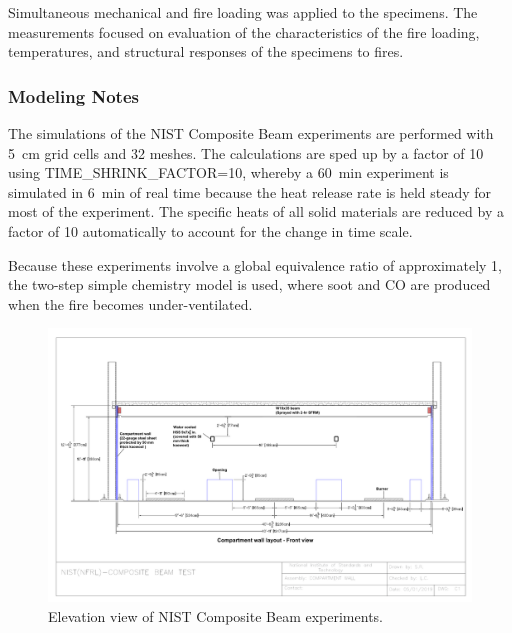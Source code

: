 Simultaneous mechanical and fire loading was applied to the specimens. The measurements focused on evaluation of the characteristics of the fire loading, temperatures, and structural responses of the specimens to fires.

\subsubsection{Modeling Notes}

The simulations of the NIST Composite Beam experiments are performed with 5~cm grid cells and 32 meshes. The calculations are sped up by a factor of 10 using {\ct TIME\_SHRINK\_FACTOR=10}, whereby a 60~min experiment is simulated in 6~min of real time because the heat release rate is held steady for most of the experiment. The specific heats of all solid materials are reduced by a factor of 10 automatically to account for the change in time scale.

Because these experiments involve a global equivalence ratio of approximately 1, the two-step simple chemistry model is used, where soot and CO are produced when the fire becomes under-ventilated.

\begin{figure}
\includegraphics[width=\textwidth]{FIGURES/NIST_Composite_Beam/NFRL_CompositeBeamTest_CompartmentWallLayout_1}
\caption[Elevation view of NIST Composite Beam experiments]{Elevation view of NIST Composite Beam experiments.}
\label{NIST_Composite_Beam_Drawing_1}
\end{figure}

